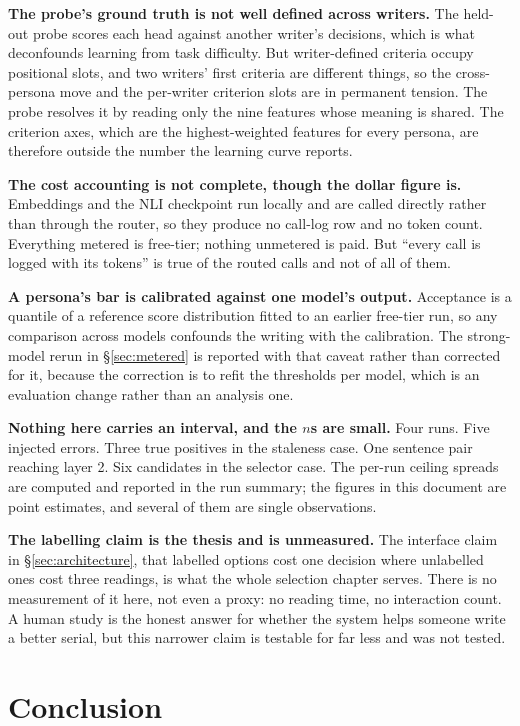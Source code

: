 \documentclass{article}
\begin{document}
\textbf{The probe's ground truth is not well defined across writers.} The held-out probe
scores each head against another writer's decisions, which is what deconfounds learning from
task difficulty. But writer-defined criteria occupy positional slots, and two writers' first
criteria are different things, so the cross-persona move and the per-writer criterion slots
are in permanent tension. The probe resolves it by reading only the nine features whose
meaning is shared. The criterion axes, which are the highest-weighted features for every
persona, are therefore outside the number the learning curve reports.

\textbf{The cost accounting is not complete, though the dollar figure is.} Embeddings and
the NLI checkpoint run locally and are called directly rather than through the router, so
they produce no call-log row and no token count. Everything metered is free-tier; nothing
unmetered is paid. But ``every call is logged with its tokens'' is true of the routed calls
and not of all of them.

\textbf{A persona's bar is calibrated against one model's output.} Acceptance is a quantile
of a reference score distribution fitted to an earlier free-tier run, so any comparison across
models confounds the writing with the calibration. The strong-model rerun in
\S\ref{sec:metered} is reported with that caveat rather than corrected for it, because the
correction is to refit the thresholds per model, which is an evaluation change rather than an
analysis one.

\textbf{Nothing here carries an interval, and the $n$s are small.} Four runs. Five injected
errors. Three true positives in the staleness case. One sentence pair reaching layer 2. Six
candidates in the selector case. The per-run ceiling spreads are computed and reported in the
run summary; the figures in this document are point estimates, and several of them are single
observations.

\textbf{The labelling claim is the thesis and is unmeasured.} The interface claim in
\S\ref{sec:architecture}, that labelled options cost one decision where unlabelled ones cost
three readings, is what the whole selection chapter serves. There
is no measurement of it here, not even a proxy: no reading time, no interaction count. A
human study is the honest answer for whether the system helps someone write a better serial,
but this narrower claim is testable for far less and was not tested.


\section{Conclusion}
\end{document}
